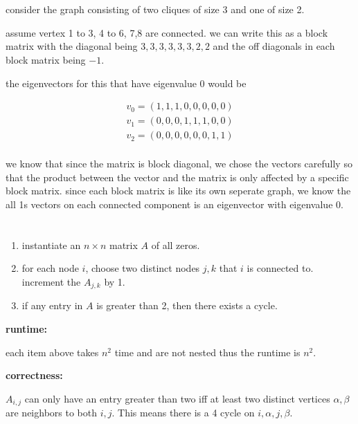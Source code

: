 \documentclass{article}
\begin{document}
\section{}

consider the graph consisting of two cliques of size 3 and one of size 2. 

assume vertex 1 to 3, 4 to 6, 7,8 are connected. we can write this as a block matrix with the diagonal being \(3,3,3,3,3,3,2,2\) and the off diagonals in each block matrix being \(-1\). 

the eigenvectors for this that have eigenvalue 0 would be 

\begin{equation}
\begin{split}
    v_0 = (1,1,1,0,0,0,0,0)\\
    v_1 = (0,0,0,1,1,1,0,0)\\
    v_2 = (0,0,0,0,0,0,1,1)\\
\end{split}
\end{equation}

we know that since the matrix is block diagonal, we chose the vectors carefully so that the product between the vector and the matrix is only affected by a specific block matrix. since each block matrix is like its own seperate graph, we know the all 1s vectors on each connected component is an eigenvector with eigenvalue 0. 

\section{}
\begin{enumerate}
  \item 
  instantiate an \(n\times n\) matrix \(A\) of all zeros. 
  \item 
  for each node \(i\), choose two distinct nodes \(j,k\) that \(i\) is connected to. increment the \(A_{j,k}\) by 1. 
  \item 
  if any entry in \(A\) is greater than 2, then there exists a cycle. 
\end{enumerate}

\textbf{runtime:}

each item above takes \(n^2\) time and are not nested thus the runtime is \(n^2\). 

\textbf{correctness:}

\(A_{i,j}\) can only have an entry greater than two iff at least two distinct vertices \(\alpha,\beta\) are neighbors to both \(i,j\). This means there is a 4 cycle on \(i,\alpha,j,\beta\). 
\end{document}
